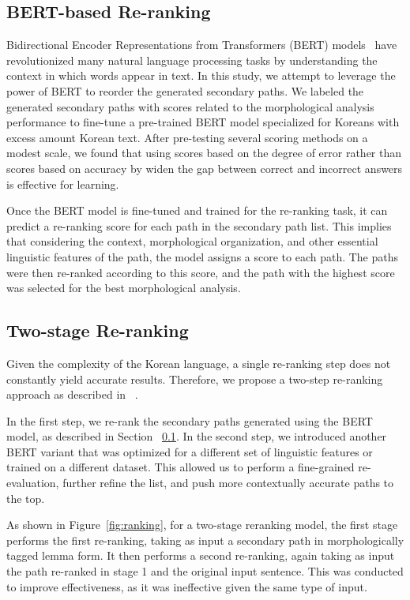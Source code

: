 \documentclass[AMS,STIX2COL]{WileyNJD-v2}
\begin{document}
    \subsection{BERT-based Re-ranking}\label{subsec:bert-based-reranking}

    Bidirectional Encoder Representations from Transformers (BERT) models~\cite{Devlin2019} have revolutionized many natural language processing tasks by understanding the context in which words appear in text.
    In this study, we attempt to leverage the power of BERT to reorder the generated secondary paths.
    We labeled the generated secondary paths with scores related to the morphological analysis performance to fine-tune a pre-trained BERT model specialized for Koreans with excess amount Korean text.
    After pre-testing several scoring methods on a modest scale, we found that using scores based on the degree of error rather than scores based on accuracy by widen the gap between correct and incorrect answers is effective for learning.

    Once the BERT model is fine-tuned and trained for the re-ranking task, it can predict a re-ranking score for each path in the secondary path list.
    This implies that considering the context, morphological organization, and other essential linguistic features of the path, the model assigns a score to each path.
    The paths were then re-ranked according to this score, and the path with the highest score was selected for the best morphological analysis.

    \subsection{Two-stage Re-ranking}\label{subsec:two-stage-reranking}

    Given the complexity of the Korean language, a single re-ranking step does not constantly yield accurate results.
    Therefore, we propose a two-step re-ranking approach as described in ~\cite{Nogueira2019}.

    In the first step, we re-rank the secondary paths generated using the BERT model, as described in Section ~\ref{subsec:bert-based-reranking}.
    In the second step, we introduced another BERT variant that was optimized for a different set of linguistic features or trained on a different dataset.
    This allowed us to perform a fine-grained re-evaluation, further refine the list, and push more contextually accurate paths to the top.

    As shown in Figure~\ref{fig:ranking}, for a two-stage reranking model, the first stage performs the first re-ranking, taking as input a secondary path in morphologically tagged lemma form.
    It then performs a second re-ranking, again taking as input the path re-ranked in stage 1 and the original input sentence.
    This was conducted to improve effectiveness, as it was ineffective given the same type of input.
\end{document}
